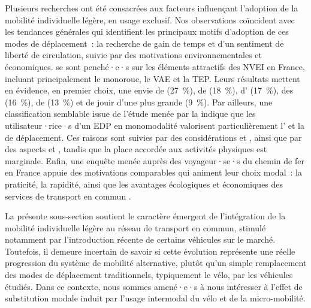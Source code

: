 \begin{refsegment}
Plusieurs recherches ont été consacrées aux facteurs influençant l'adoption de la mobilité individuelle légère, en usage exclusif. Nos observations coïncident avec les tendances générales qui identifient les principaux motifs d'adoption de ces modes de déplacement~: la recherche de gain de temps et d'un sentiment de liberté de circulation, suivie par des motivations environnementales et économiques. \textcolor{blue}{\textcite[16-17]{pages_nouveaux_2021}} se sont penché·e·s sur les éléments attractifs des \acrfull{NVEI} en France, incluant principalement le monoroue, le \acrshort{VAE} et la \acrshort{TEP}. Leurs résultats mettent en évidence, en premier choix, une envie de  (27~\%), de  (18~\%), d' (17~\%), des  (16~\%), de  (13~\%) et de jouir d'une plus grande  (9~\%). Par ailleurs, une classification semblable issue de l'étude menée par la \textcolor{blue}{\textcite[15]{smart_mobility_lab_usages_2020}} indique que les utilisateur·rice·s d'un \acrfull{EDP} en monomodalité valorisent particulièrement l' et la  de déplacement. Ces raisons sont suivies par des considérations  et , ainsi que par des aspects  et , tandis que la place accordée aux activités physiques est marginale. Enfin, une enquête menée auprès des voyageur·se·s du chemin de fer en France appuie des motivations comparables qui animent leur choix modal~: la praticité, la rapidité, ainsi que les avantages écologiques et économiques des services de transport en commun \textcolor{blue}{\autocite[24]{toluna_francais_2023}}.%

La présente sous-section soutient le caractère émergent de l'intégration de la mobilité individuelle légère au réseau de transport en commun, stimulé notamment par l'introduction récente de certains véhicules sur le marché. Toutefois, il demeure incertain de savoir si cette évolution représente une réelle progression du système de mobilité alternative, plutôt qu'un simple remplacement des modes de déplacement traditionnels, typiquement le vélo, par les véhicules étudiés. Dans ce contexte, nous sommes amené·e·s à nous intéresser à l'effet de substitution modale induit par l'usage intermodal du vélo et de la micro-mobilité.%


\end{refsegment}
